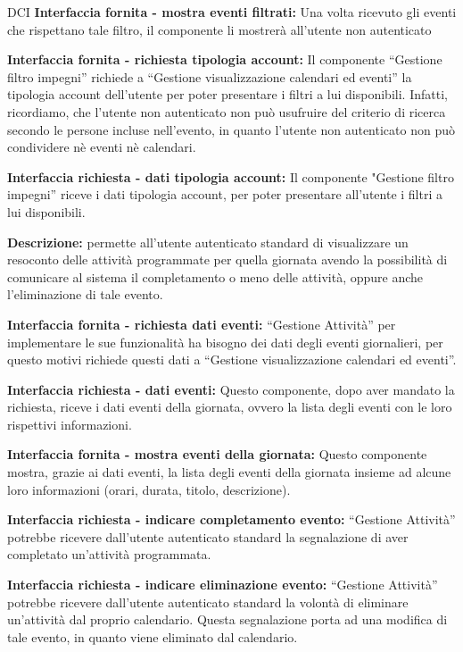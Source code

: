 \begin{listaPersonale}{DCI}
    \textbf{Interfaccia fornita - mostra eventi filtrati:} Una volta ricevuto gli eventi che rispettano tale filtro, il componente li mostrerà all'utente non autenticato

    \textbf{Interfaccia fornita - richiesta tipologia account:} Il componente “Gestione filtro impegni” richiede a “Gestione visualizzazione calendari ed eventi”  la tipologia account dell'utente per poter presentare i filtri a lui disponibili. Infatti, ricordiamo, che l'utente non autenticato non può usufruire del criterio di ricerca secondo le persone incluse nell'evento, in quanto l'utente non autenticato non può condividere nè eventi nè calendari.

    \textbf{Interfaccia richiesta - dati tipologia account:} Il componente "Gestione filtro impegni” riceve i dati tipologia account, per poter presentare all'utente i filtri a lui disponibili.



    \textbf{Descrizione:} permette all'utente autenticato standard di visualizzare un resoconto delle attività programmate per quella giornata avendo la possibilità di comunicare al sistema il completamento o meno delle attività, oppure anche l'eliminazione di tale evento.

    \textbf{Interfaccia fornita - richiesta dati eventi:} “Gestione Attività” per implementare le sue funzionalità ha bisogno dei dati degli eventi giornalieri, per questo motivi richiede questi dati a “Gestione visualizzazione calendari ed eventi”.

    \textbf{Interfaccia richiesta - dati eventi:} Questo componente, dopo aver mandato la richiesta, riceve i dati eventi della giornata, ovvero la lista degli eventi con le loro rispettivi informazioni.

    \textbf{Interfaccia fornita - mostra eventi della giornata:} Questo componente mostra, grazie ai dati eventi, la lista degli eventi della giornata insieme ad alcune loro informazioni (orari, durata, titolo, descrizione).

    \textbf{Interfaccia richiesta - indicare completamento evento:} “Gestione Attività” potrebbe ricevere dall'utente autenticato standard la segnalazione di aver completato un'attività programmata.

    \textbf{Interfaccia richiesta - indicare eliminazione evento:} “Gestione Attività” potrebbe ricevere dall'utente autenticato standard la volontà di eliminare un'attività dal proprio calendario. Questa segnalazione porta ad una modifica di tale evento, in quanto viene eliminato dal calendario.


\end{listaPersonale}
